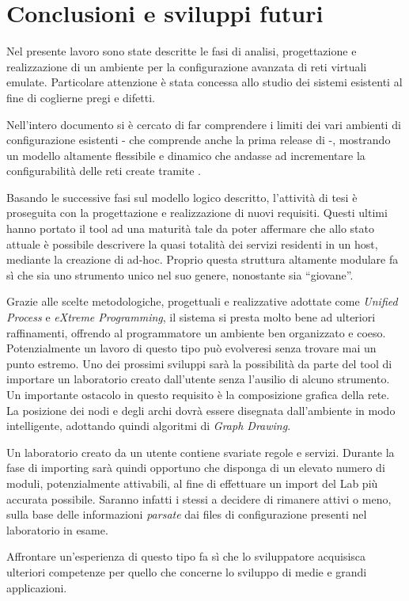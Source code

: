 \chapter*{Conclusioni e sviluppi futuri}

Nel presente lavoro sono state descritte le fasi di analisi, progettazione e realizzazione di un ambiente per la configurazione avanzata di reti virtuali emulate. Particolare attenzione è stata concessa allo studio dei sistemi esistenti al fine di coglierne pregi e difetti.

Nell'intero documento si è cercato di far comprendere i limiti dei vari ambienti di configurazione esistenti - che comprende anche la prima release di \visualnetkit{} -, mostrando un modello altamente flessibile e dinamico che andasse ad incrementare la configurabilità delle reti create tramite \visualnetkit{}.

Basando le successive fasi sul modello logico descritto, l'attività di tesi è proseguita con la progettazione e realizzazione di nuovi requisiti. Questi ultimi hanno portato il tool ad una maturità tale da poter affermare che allo stato attuale è possibile descrivere la quasi totalità dei servizi residenti in un host, mediante la creazione di \plugin{} ad-hoc. Proprio questa struttura altamente modulare fa sì che \visualnetkit{} sia uno strumento unico nel suo genere, nonostante sia ``giovane''. 

Grazie alle scelte metodologiche, progettuali e realizzative adottate come \emph{Unified Process} e \emph{eXtreme Programming}, il sistema si presta molto bene ad ulteriori raffinamenti, offrendo al programmatore un ambiente ben organizzato e coeso. Potenzialmente un lavoro di questo tipo può evolveresi senza trovare mai un punto estremo. Uno dei prossimi sviluppi sarà la possibilità da parte del tool di importare un laboratorio creato dall'utente senza l'ausilio di alcuno strumento.
Un importante ostacolo in questo requisito è la composizione grafica della rete. La posizione dei nodi e degli archi dovrà essere disegnata dall'ambiente in modo intelligente, adottando quindi algoritmi di \emph{Graph Drawing}.

Un laboratorio creato da un utente contiene svariate regole e servizi. Durante la fase di importing sarà quindi opportuno che \visualnetkit{} disponga di un elevato numero di moduli, potenzialmente attivabili, al fine di effettuare un import del Lab più accurata possibile. Saranno infatti i \plugin{} stessi a decidere di rimanere attivi o meno, sulla base delle informazioni \emph{parsate} dai files di configurazione presenti nel laboratorio in esame.

Affrontare un'esperienza di questo tipo fa sì che lo sviluppatore acquisisca ulteriori competenze per quello che concerne lo sviluppo di medie e grandi applicazioni.